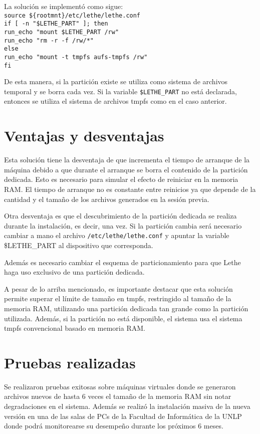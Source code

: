 \documentclass[final,narroweqnarray,inline,twoside]{ieee}
\begin{document}
La solución se implementó como sigue:
\\\texttt{source \$\{rootmnt\}/etc/lethe/lethe.conf}
\\\texttt{if [ -n "\$LETHE\_PART" ]; then}
\\\texttt{\indent run\_echo "mount \$LETHE\_PART /rw"}
\\\texttt{\indent run\_echo "rm -r -f /rw/*"}
\\\texttt{else}
\\\texttt{\indent run\_echo "mount -t tmpfs aufs-tmpfs /rw"}
\\\texttt{fi}

De esta manera, si la partición existe se utiliza como sistema de archivos temporal y se borra cada vez. Si la variable
\texttt{\$LETHE\_PART} no está declarada, entonces se utiliza el sistema de archivos tmpfs como en el caso anterior.

\section{Ventajas y desventajas}
Esta solución tiene la desventaja de que incrementa el tiempo de arranque de la máquina debido a que durante el arranque se
borra el contenido de la partición dedicada. Esto es necesario para simular el efecto de reiniciar en la memoria RAM. El
tiempo de arranque no es constante entre reinicios ya que depende de la cantidad y el tamaño de los archivos generados en la
sesión previa. 

Otra desventaja es que el descubrimiento de la partición dedicada se realiza durante la instalación, es decir, una vez. Si la
partición cambia será necesario cambiar a mano el archivo \texttt{/etc/lethe/lethe.conf} y apuntar la variable \$LETHE\_PART
al dispositivo que corresponda.

Además es necesario cambiar el esquema de particionamiento para que Lethe haga uso exclusivo de una partición dedicada.

A pesar de lo arriba mencionado, es importante destacar que esta solución permite superar el límite de tamaño en tmpfs,
restringido al tamaño de la memoria RAM, utilizando una partición
dedicada tan grande como la partición utilizada. Además, si la partición no está disponible, el sistema usa el sistema tmpfs
convencional basado en memoria RAM.

\section{Pruebas realizadas}
Se realizaron pruebas exitosas sobre máquinas virtuales donde se generaron archivos nuevos de hasta 6 veces el tamaño de la
memoria RAM sin notar degradaciones en el sistema. Además se realizó la instalación masiva de la nueva versión en una de las
salas de PCs de la Facultad de Informática de la UNLP donde podrá monitorearse su desempeño durante los próximos 6
meses.
\end{document}
